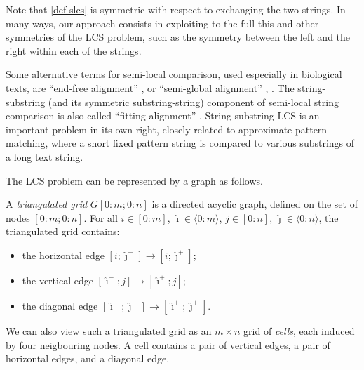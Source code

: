 \documentclass[a4paper,UKenglish,cleveref]{lipics-v2021}
\newcommand{\A}{\hat}
\newcommand{\bra}[1]{[#1]}
\newcommand{\ang}[1]{\langle#1\rangle}
\begin{document}
Note that \cref{def-slcs} is symmetric with respect to exchanging the two strings.
In many ways, our approach consists in exploiting to the full 
this and other symmetries of the LCS problem,
such as the symmetry between the left and the right within each of the strings.

Some alternative terms for semi-local comparison,
used especially in biological texts, 
are ``end-free alignment''
\cite{Jackson_Aluru:06}, \cite[Subsection 11.6.4]{Gusfield:97}
or ``semi-global alignment'' 
\cite{Jackson_Aluru:06}, \cite[Problem 6.24]{Jones_Pevzner:04}.
The string-substring (and its symmetric substring-string) component
of semi-local string comparison is also called ``fitting alignment'' 
\cite[Problem 6.23]{Jones_Pevzner:04}.
String-substring LCS is an important problem in its own right,
closely related to approximate pattern matching,
where a short fixed pattern string 
is compared to various substrings of a long text string.

The LCS problem can be represented by a graph as follows.
%
\begin{definition}
\label{def-grid}
%
%
A \emph{triangulated grid} $G\bra{0:m;0:n}$ is a directed acyclic graph, 
defined on the set of nodes $\bra{0:m;0:n}$.
For all $i \in \bra{0:m}$, $\A\imath \in \ang{0:m}$,
$j \in \bra{0:n}$, $\A\jmath \in \ang{0:n}$,
the triangulated grid contains:
%
\begin{itemize}
%
\item the horizontal edge $\bra{i;\A\jmath^-} \to \bra{i;\A\jmath^+}$;
%
\item the vertical edge $\bra{\A\imath^-;j} \to \bra{\A\imath^+;j}$;
%
\item the diagonal edge $\bra{\A\imath^-;\A\jmath^-} \to \bra{\A\imath^+;\A\jmath^+}$.
%
\end{itemize}
%
\end{definition}
%
We can also view such a triangulated grid as an $m \times n$ 
grid of \emph{cells}, each induced by four neigbouring nodes.
A cell contains a pair of vertical edges, a pair of horizontal edges, and a diagonal edge.
\end{document}
